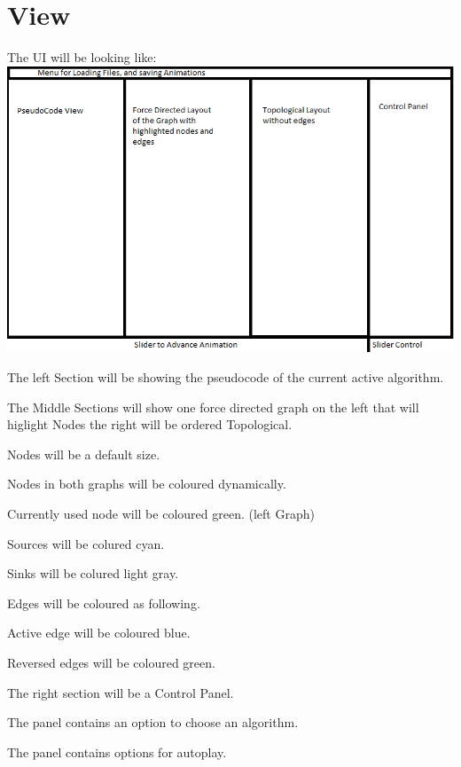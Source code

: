 \section{View}
The UI will be looking like: \\
\includegraphics[width=\textwidth]{parts/UIFinished}
\begin{list}{-}{}
\item The left Section will be showing the pseudocode of the current active algorithm.
\item The Middle Sections will show one force directed  graph on the left that will higlight Nodes the right will be ordered Topological.

\item Nodes will be a default size.
\item Nodes in both graphs will be coloured dynamically.
\begin{list}{-}{}
\item Currently used node will be coloured green. (left Graph)
\item Sources will be colured cyan.
\item Sinks will be colured light gray.
\end{list}
\item Edges will be coloured as following.
\begin{list}{-}{}
\item Active edge will be coloured blue.
\item Reversed edges will be coloured green.
\end{list}
\item The right section will be a Control Panel.
\begin{list}{-}{}
\item The panel contains an option to choose an algorithm.
\item The panel contains options  for autoplay.

\end{list}
\end{list}




